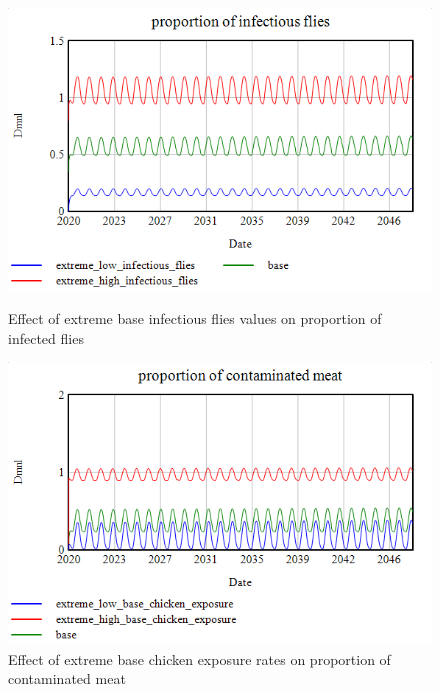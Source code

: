\begin{figure}[h!]
    \centering
    \begin{minipage}{0.45\textwidth}
        \centering
        \includegraphics[width=\textwidth]{images/extremes/base_infectious_flies_proportion_flies.png} 
        \caption{Effect of extreme base infectious flies values on proportion of infected flies}
        \label{fig:prop_flies}
    \end{minipage}
    \begin{minipage}{0.45\textwidth}
        \centering
        \includegraphics[width=\textwidth]{images/extremes/Base_chicken_exposure_contaminated_meat.png} 
        \caption{Effect of extreme base chicken exposure rates on proportion of contaminated meat}
        \label{fig:exposure_meat}
    \end{minipage}
\end{figure}

